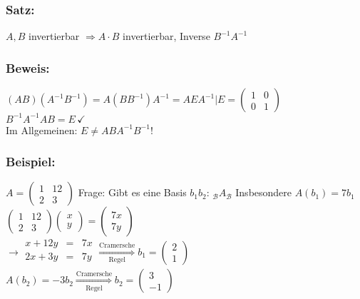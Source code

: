 \subsubsection{Satz:}
$A,B$ invertierbar $\Rightarrow A \cdot B$ invertierbar, Inverse $B^{-1}A^{-1}$
%
%
%
\subsubsection{Beweis:}
$(AB)(A^{-1}B^{-1})=A(BB^{-1})A^{-1}=AEA^{-1}|E=\begin{pmatrix}1 & 0 \\ 0 &1 \end{pmatrix}$\\
$B^{-1}A^{-1}AB=E \, \checkmark$\\
Im Allgemeinen: $E \neq ABA^{-1}B^{-1}$!
%
%
%
\subsubsection{Beispiel:}
$A=\begin{pmatrix} 1 & 12 \\ 2 & 3 \end{pmatrix}$ Frage: Gibt es eine Basis $b_{1}b_{2}: \,  _{\mathcal{B}}A_{\mathcal{B}}$ %
Insbesondere $A(b_{1})=7b_{1}$  $\begin{pmatrix}1 & 12 \\ 2 & 3 \end{pmatrix} \begin{pmatrix} x \\ y \end{pmatrix} = \begin{pmatrix} 7x \\ 7y \end{pmatrix}$ \\
$\rightarrow
\begin{array}{rcr}
x + 12y &=& 7x\\
2x + 3y &=& 7y\\
\end{array}
\mathop{\Rightarrow}\limits^{\text{Cramersche}}_{\text{Regel}} b_{1} = \begin{pmatrix} 2 \\ 1 \end{pmatrix}$\\
$A(b_{2}) = -3b_{2} \mathop{\Rightarrow}\limits^{\text{Cramersche}}_{\text{Regel}} b_{2} = \begin{pmatrix} 3 \\ -1 \end{pmatrix}$\\
%
%
%
